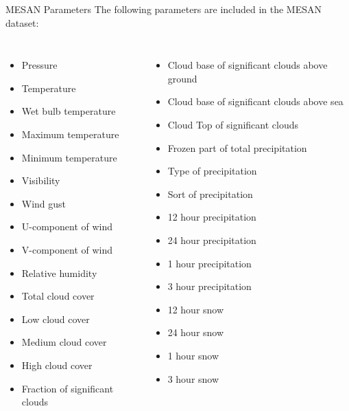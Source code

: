 \documentclass[10pt]{beamer}
\begin{document}
\begin{frame}[shrink=10]{MESAN Parameters}
The following parameters are included in the MESAN dataset:
\begin{columns}
	\begin{itemize}
		\item Pressure
		\item Temperature
		\item Wet bulb temperature
		\item Maximum temperature
		\item Minimum temperature
		\item Visibility
		\item Wind gust
		\item U-component of wind
		\item V-component of wind
		\item Relative humidity
		\item Total cloud cover
		\item Low cloud cover
		\item Medium cloud cover
		\item High cloud cover
		\item Fraction of significant clouds
	\end{itemize}
	\begin{itemize}
		\item Cloud base of significant clouds above ground
		\item Cloud base of significant clouds above sea
		\item Cloud Top of significant clouds
		\item Frozen part of total precipitation
		\item Type of precipitation
		\item Sort of precipitation
		\item 12 hour precipitation
		\item 24 hour precipitation
		\item 1 hour precipitation
		\item 3 hour precipitation
		\item 12 hour snow
		\item 24 hour snow
		\item 1 hour snow
		\item 3 hour snow
	\end{itemize}
\end{columns}
\end{frame}
\end{document}
